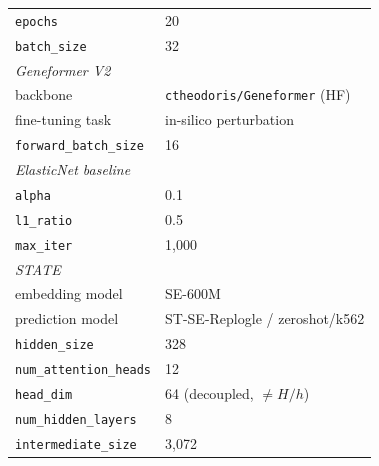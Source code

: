 \documentclass{article}
\theoremstyle{plain}
\theoremstyle{definition}
\theoremstyle{remark}
\begin{document}
\begin{table}[h]
\begin{tabular}{ll}
\hspace{1em}\texttt{epochs}                                & 20 \\
\hspace{1em}\texttt{batch\_size}                           & 32 \\
\midrule
\multicolumn{2}{l}{\textit{Geneformer V2}~\citep{theodoris2023geneformer}} \\
\hspace{1em}backbone                                       & \texttt{ctheodoris/Geneformer} (HF) \\
\hspace{1em}fine-tuning task                               & in-silico perturbation \\
\hspace{1em}\texttt{forward\_batch\_size}                  & 16 \\
\midrule
\multicolumn{2}{l}{\textit{ElasticNet baseline}~\citep{zou2005elasticnet}} \\
\hspace{1em}\texttt{alpha}                                 & 0.1 \\
\hspace{1em}\texttt{l1\_ratio}                             & 0.5 \\
\hspace{1em}\texttt{max\_iter}                             & 1{,}000 \\
\midrule
\multicolumn{2}{l}{\textit{STATE}~\citep{arc2025state}} \\
\hspace{1em}embedding model                                & SE-600M \\
\hspace{1em}prediction model                               & ST-SE-Replogle / zeroshot/k562 \\
\hspace{1em}\texttt{hidden\_size}                          & 328 \\
\hspace{1em}\texttt{num\_attention\_heads}                 & 12 \\
\hspace{1em}\texttt{head\_dim}                             & 64 (decoupled, $\neq H/h$) \\
\hspace{1em}\texttt{num\_hidden\_layers}                   & 8 \\
\hspace{1em}\texttt{intermediate\_size}                    & 3{,}072 \\

\end{tabular}
\end{table}
\end{document}
